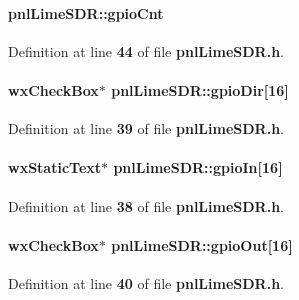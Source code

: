 \paragraph[{gpio\+Cnt}]{ pnl\+Lime\+S\+D\+R\+::gpio\+Cnt\hspace{0.3cm}{\ttfamily [protected]}}\label{classpnlLimeSDR_a7ea597f9041780b4f17dd891ca1727c6}


Definition at line {\bf 44} of file {\bf pnl\+Lime\+S\+D\+R.\+h}.

\paragraph[{gpio\+Dir}]{\setlength{\rightskip}{0pt plus 5cm}wx\+Check\+Box$\ast$ pnl\+Lime\+S\+D\+R\+::gpio\+Dir[16]\hspace{0.3cm}{\ttfamily [protected]}}\label{classpnlLimeSDR_a7d720be4f11616bf23249170bf9c5ac8}


Definition at line {\bf 39} of file {\bf pnl\+Lime\+S\+D\+R.\+h}.

\paragraph[{gpio\+In}]{\setlength{\rightskip}{0pt plus 5cm}wx\+Static\+Text$\ast$ pnl\+Lime\+S\+D\+R\+::gpio\+In[16]\hspace{0.3cm}{\ttfamily [protected]}}\label{classpnlLimeSDR_a3c6132cef221dbe6a91132e248d9eb2a}


Definition at line {\bf 38} of file {\bf pnl\+Lime\+S\+D\+R.\+h}.

\paragraph[{gpio\+Out}]{\setlength{\rightskip}{0pt plus 5cm}wx\+Check\+Box$\ast$ pnl\+Lime\+S\+D\+R\+::gpio\+Out[16]\hspace{0.3cm}{\ttfamily [protected]}}\label{classpnlLimeSDR_a73bef324a0701ede331446655cf7607c}


Definition at line {\bf 40} of file {\bf pnl\+Lime\+S\+D\+R.\+h}.

